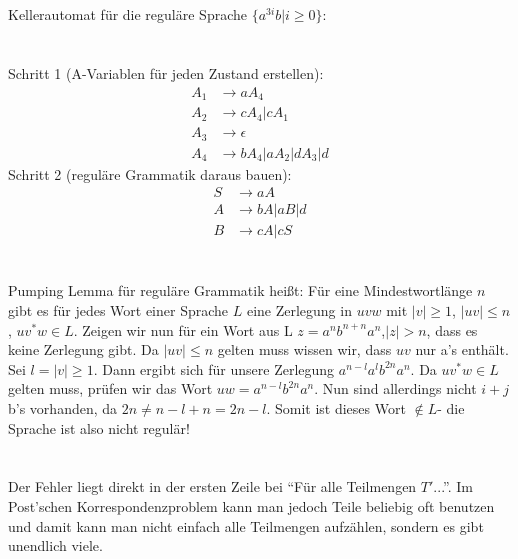 \documentclass{article}
\begin{document}
\section{}
Kellerautomat für die reguläre Sprache $\{a^{3i}b|i\geq0\}$:


\section{}
Schritt 1 (A-Variablen für jeden Zustand erstellen):
\begin{align*}
A_1&\rightarrow aA_4\\
A_2&\rightarrow cA_4|cA_1\\
A_3&\rightarrow \epsilon\\
A_4&\rightarrow bA_4 | aA_2 | dA_3 |d
\end{align*}
Schritt 2 (reguläre Grammatik daraus bauen):
\begin{align*}
S&\rightarrow aA\\
A&\rightarrow bA |aB|d\\
B&\rightarrow cA |cS
\end{align*}

\section{}
Pumping Lemma für reguläre Grammatik heißt: Für eine Mindestwortlänge $n$ gibt es für jedes Wort einer Sprache $L$ eine Zerlegung in $uvw$ mit $|v|\geq 1$, $|uv|\leq n$, $uv^*w \in L$. Zeigen wir nun für ein Wort aus L $z=a^nb^{n+n}a^n$,$|z|>n$, dass es keine Zerlegung gibt. Da $|uv|\leq n$ gelten muss wissen wir, dass $uv$ nur a's enthält. Sei $l=|v|\geq 1$. Dann ergibt sich für unsere Zerlegung $a^{n-l}a^lb^{2n}a^n$. Da $uv^*w \in L$ gelten muss, prüfen wir das Wort $uw = a^{n-l}b^{2n}a^n$. Nun sind allerdings nicht $i+j$ b's vorhanden, da $2n\neq n-l+n = 2n-l$. Somit ist dieses Wort $\notin L$- die Sprache ist also nicht regulär!

\section{}
Der Fehler liegt direkt in der ersten Zeile bei "`Für alle Teilmengen $T'$..."'. Im Post'schen Korrespondenzproblem kann man jedoch Teile beliebig oft benutzen und damit kann man nicht einfach alle Teilmengen aufzählen, sondern es gibt unendlich viele.
\end{document}
